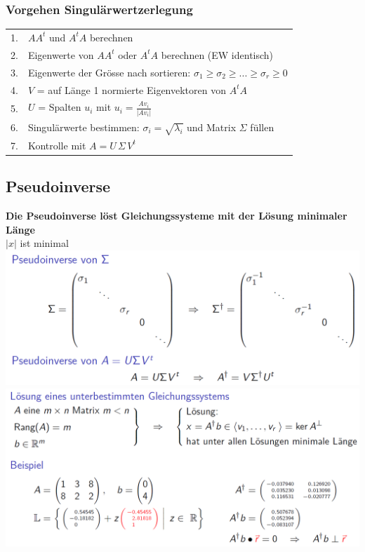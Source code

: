 		   
			
		   
		   \subsubsection{Vorgehen Singulärwertzerlegung}
		   \begin{tabular}{ll}
		   1. & $AA^t$ und $A^tA$ berechnen \\
		   2. & Eigenwerte von $AA^t$ oder $A^tA$ berechnen (EW identisch) \\
		   3. & Eigenwerte der Grösse nach sortieren: $\sigma_1 \geq \sigma_2 \geq ... \geq \sigma_r \geq 0$\\
		   4. & $V$ = auf Länge 1 normierte Eigenvektoren von $A^tA$ \\
		   5. & $U$ = Spalten $u_i$ mit $u_i = \frac{A v_i}{\vert A v_i \vert}$ \\
		   6. & Singulärwerte bestimmen: $\sigma_i = \sqrt{\lambda_i}$ und Matrix $\Sigma$ füllen \\
		   7. & Kontrolle mit $A = U \, \Sigma \, V^t$ \\
		   \end{tabular}
		   
		   
			
	
			
			
		   \subsection{Pseudoinverse}
			\textbf{Die Pseudoinverse löst  Gleichungssysteme mit der Lösung minimaler Länge}		\\   
			$\vert x \vert$ ist minimal \\
		   
		     \includegraphics[width=0.8\linewidth]{Bilder/pseudoinverse} \\
		     
		    \includegraphics[width=0.8\linewidth]{Bilder/pseudoinverse2} \\
		    
		    
		    